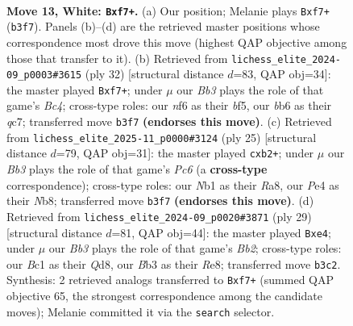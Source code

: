 \documentclass[11pt]{article}
\begin{document}
\clearpage

\begin{figure}[p]\centering
\begin{subfigure}{0.46\textwidth}\centering
\resizebox{\linewidth}{!}{%
\newchessgame
\chessboard[
  setfen={r2q2k1/1bp2rpp/pb1p1n2/1p2n3/4P3/1BP5/PP3PPP/RNBQR1K1 w - - 0 13},
  showmover=false,
  pgfstyle=straightmove, color=movearrow, markmove={b3-f7}
]}
\caption{}
\end{subfigure}\hfill
\begin{subfigure}{0.46\textwidth}\centering
\resizebox{\linewidth}{!}{%
\newchessgame
\chessboard[
  setfen={2r1r1k1/ppq1ppbp/2n3p1/5b2/P1BP4/2P2N1P/Q4PP1/R1BR2K1 w - - 7 17},
  showmover=false,
  pgfstyle=straightmove, color=movearrow, markmove={c4-f7}
]}
\caption{}
\end{subfigure}
\\[4pt]
\begin{subfigure}{0.46\textwidth}\centering
\resizebox{\linewidth}{!}{%
\newchessgame
\chessboard[
  setfen={rnbq3r/pp3pkp/2p5/b7/5B2/PBpP4/1PP1Q1PP/2KR2NR b - - 1 13},
  showmover=false,
  pgfstyle=straightmove, color=movearrow, markmove={c3-b2}
]}
\caption{}
\end{subfigure}\hfill
\begin{subfigure}{0.46\textwidth}\centering
\resizebox{\linewidth}{!}{%
\newchessgame
\chessboard[
  setfen={r2qr1k1/1bp2ppp/pb1p4/np6/P2PN3/4BN1P/BP3PP1/R2Q1RK1 b - - 0 15},
  showmover=false,
  pgfstyle=straightmove, color=movearrow, markmove={b7-e4}
]}
\caption{}
\end{subfigure}
\caption{\textbf{Move 13, White: \texttt{Bxf7+}.} (a) Our position; Melanie plays \texttt{Bxf7+} (\texttt{b3f7}). Panels (b)--(d) are the retrieved master positions whose correspondence most drove this move (highest QAP objective among those that transfer to it). (b) Retrieved from \texttt{lichess\_elite\_2024-09\_p0003\#3615} (ply 32) [structural distance $d$=83, QAP obj=34]: the master played \texttt{Bxf7+}; under $\mu$ our \emph{Bb3} plays the role of that game's \emph{Bc4}; cross-type roles: our \emph{n}f6 as their \emph{b}f5, our \emph{b}b6 as their \emph{q}c7; transferred move \texttt{b3f7} \textbf{(endorses this move)}. (c) Retrieved from \texttt{lichess\_elite\_2025-11\_p0000\#3124} (ply 25) [structural distance $d$=79, QAP obj=31]: the master played \texttt{cxb2+}; under $\mu$ our \emph{Bb3} plays the role of that game's \emph{Pc6} (a \textbf{cross-type} correspondence); cross-type roles: our \emph{N}b1 as their \emph{R}a8, our \emph{P}e4 as their \emph{N}b8; transferred move \texttt{b3f7} \textbf{(endorses this move)}. (d) Retrieved from \texttt{lichess\_elite\_2024-09\_p0020\#3871} (ply 29) [structural distance $d$=81, QAP obj=44]: the master played \texttt{Bxe4}; under $\mu$ our \emph{Bb3} plays the role of that game's \emph{Bb2}; cross-type roles: our \emph{B}c1 as their \emph{Q}d8, our \emph{B}b3 as their \emph{R}e8; transferred move \texttt{b3c2}. Synthesis: 2 retrieved analogs transferred to \texttt{Bxf7+} (summed QAP objective 65, the strongest correspondence among the candidate moves); Melanie committed it via the \texttt{search} selector.}
\label{fig:thought-m24}
\end{figure}
\end{document}
